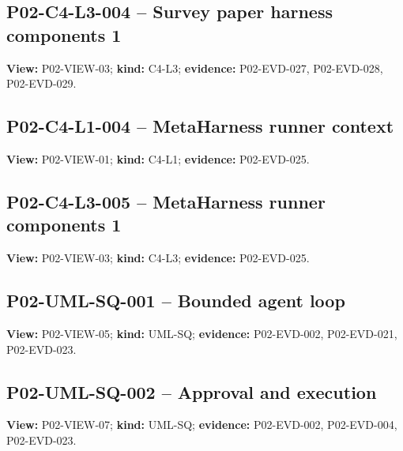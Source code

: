 \documentclass[10pt,letterpaper]{article}
\begin{document}
\subsection{P02-C4-L3-004 -- Survey paper harness components 1}
\textbf{View:} P02-VIEW-03; \textbf{kind:} C4-L3; \textbf{evidence:} P02-EVD-027, P02-EVD-028, P02-EVD-029.\par
{}
\clearpage

\subsection{P02-C4-L1-004 -- MetaHarness runner context}
\textbf{View:} P02-VIEW-01; \textbf{kind:} C4-L1; \textbf{evidence:} P02-EVD-025.\par
{}
\clearpage

\subsection{P02-C4-L3-005 -- MetaHarness runner components 1}
\textbf{View:} P02-VIEW-03; \textbf{kind:} C4-L3; \textbf{evidence:} P02-EVD-025.\par
{}
\clearpage

\subsection{P02-UML-SQ-001 -- Bounded agent loop}
\textbf{View:} P02-VIEW-05; \textbf{kind:} UML-SQ; \textbf{evidence:} P02-EVD-002, P02-EVD-021, P02-EVD-023.\par
{}
\clearpage

\subsection{P02-UML-SQ-002 -- Approval and execution}
\textbf{View:} P02-VIEW-07; \textbf{kind:} UML-SQ; \textbf{evidence:} P02-EVD-002, P02-EVD-004, P02-EVD-023.\par
{}
\clearpage
\end{document}
